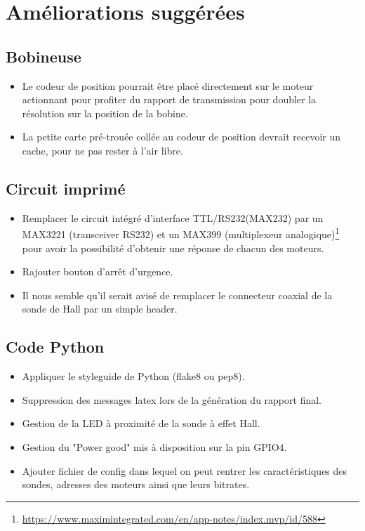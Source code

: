 \documentclass[12pt,a4paper]{article}
\begin{document}
\section{Améliorations suggérées}
\subsection{Bobineuse}
\begin{itemize}\itemsep=6pt
\item Le codeur de position pourrait être placé directement sur le moteur actionnant pour profiter du rapport de transmission pour doubler la résolution sur la position de la bobine.
\item La petite carte pré-trouée collée au codeur de position devrait recevoir un cache, pour ne pas rester à l'air libre. 
\end{itemize}


\subsection{Circuit imprimé}
\begin{itemize}\itemsep=6pt
\item Remplacer le circuit intégré d'interface TTL/RS232(MAX232) par un MAX3221 (transceiver RS232) et un MAX399 (multiplexeur analogique)\footnote{\url{https://www.maximintegrated.com/en/app-notes/index.mvp/id/588}} pour avoir la possibilité d'obtenir une réponse de chacun des moteurs. 
\item Rajouter bouton d'arrêt d'urgence.
\item Il nous semble qu'il serait avisé de remplacer le connecteur coaxial de la sonde de Hall par un simple header. 
\end{itemize}

\subsection{Code Python}
\begin{itemize}\itemsep=6pt
\item Appliquer le styleguide de Python (flake8 ou pep8).
\item Suppression des messages latex lors de la génération du rapport final.
\item Gestion de la LED à proximité de la sonde à effet Hall.
\item Gestion du "Power good" mis à disposition sur la pin GPIO4.
\item Ajouter fichier de config dans lequel on peut rentrer les caractéristiques des sondes, adresses des moteurs ainsi que leurs bitrates.
\end{itemize}
\end{document}

